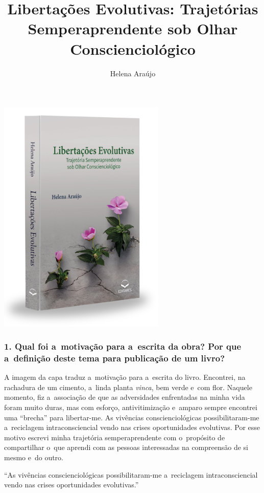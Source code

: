 \documentclass{gescons}
\author{Helena Araújo}
\title{Libertações Evolutivas: Trajetórias Semperaprendente sob Olhar Conscienciológico}
\begin{document}
    \makeentrevistatitle

    \begin{multicols}{2}

\begin{center}
    \includegraphics[width=8cm]{articles/entrevista/mockups/Helena_Araujo.png}
\end{center}


\subsubsection{1. Qual foi a~motivação para a~escrita da obra? Por que a~definição deste tema para publicação de um livro?}

A imagem da capa traduz a~motivação para a~escrita do livro. Encontrei, na rachadura de um cimento, a~linda planta \emph{vinca}, bem verde e~com flor. Naquele momento, fiz a~associação de que as adversidades enfrentadas na minha vida foram muito duras, mas com esforço, antivitimização e~amparo sempre encontrei uma ``brecha'' para libertar-me. As vivências conscienciológicas possibilitaram-me a~reciclagem intraconsciencial vendo nas crises oportunidades evolutivas. Por esse motivo escrevi minha trajetória semperaprendente com o~propósito de compartilhar o~que aprendi com as pessoas interessadas na compreensão de si mesmo e~do outro.

\begin{pullquote}
``As vivências conscienciológicas possibilitaram-me a~reciclagem intraconsciencial vendo nas crises oportunidades evolutivas.''
\end{pullquote}


\end{multicols}
\end{document}
